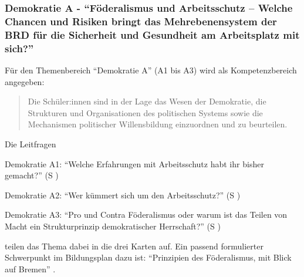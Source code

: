 \subsubsection{Demokratie A - \enquote{Föderalismus und Arbeitsschutz – Welche Chancen und Risiken bringt das Mehrebenensystem der BRD für die Sicherheit und Gesundheit am Arbeitsplatz mit sich?} \label{DemokratieA}}

Für den Themenbereich \enquote{Demokratie A} (A1 bis A3) wird als Kompetenzbereich angegeben:
\begin{quote}
    Die Schüler:innen sind in der Lage das Wesen der Demokratie, die Strukturen und Organisationen des politischen Systems sowie die Mechanismen politischer Willensbildung einzuordnen und zu beurteilen.
    
    \autocite[im Bildungsplan:][16]{bplan}
\end{quote}


Die Leitfragen
\begin{myenumerate}
    \item Demokratie A1: \enquote{Welche Erfahrungen mit Arbeitsschutz habt ihr bisher gemacht?} (\gls{S} \pageref{DEMOKRATIE-A1})
    \item Demokratie A2: \enquote{Wer kümmert sich um den Arbeitsschutz?} (\gls{S} \pageref{DEMOKRATIE-A2})
    \item Demokratie A3: \enquote{Pro und Contra Föderalismus oder warum ist das Teilen von Macht ein Strukturprinzip demokratischer Herrschaft?} (\gls{S} \pageref{DEMOKRATIE-A3})
\end{myenumerate}
teilen das Thema dabei in die drei Karten auf.
Ein passend formulierter Schwerpunkt im Bildungsplan dazu ist: \enquote{Prinzipien des Föderalismus, mit Blick auf Bremen} \autocite[16]{bplan}.
\bigskip


